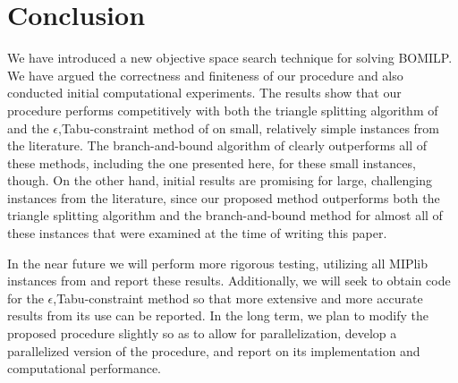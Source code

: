 \documentclass[12pt]{article}
\begin{document}
\section{Conclusion} \label{sec:conclude}
We have introduced a new objective space search technique for solving BOMILP. We have argued the correctness and finiteness of our procedure and also conducted initial computational experiments. The results show that  our procedure performs competitively with both the triangle splitting algorithm of \citet{boland2015criterion} and the $\epsilon$,Tabu-constraint method of \citet{soylu2016exact} on small, relatively simple instances from the literature. The branch-and-bound algorithm of \citet{adelgren2016} clearly outperforms all of these methods, including the one presented here, for these small instances, though. On the other hand, initial results are promising for large, challenging instances from the literature, since our proposed method outperforms both the triangle splitting algorithm and the branch-and-bound method for almost all of these instances that were examined at the time of writing this paper. 

In the near future we will perform more rigorous testing, utilizing all MIPlib instances from \citep{adelgren2016} and report these results. Additionally, we will seek to obtain code for the $\epsilon$,Tabu-constraint method so that more extensive and more accurate results from its use can be reported. In the long term, we plan to modify the proposed procedure slightly so as to allow for parallelization, develop a parallelized version of the procedure, and report on its implementation and computational performance.



\end{document}
